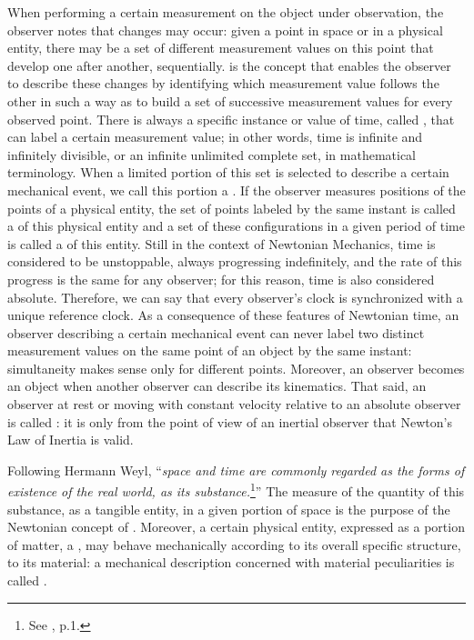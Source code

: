 When performing a certain measurement on the object under observation, the observer notes that changes may occur: given a point in space or in a physical entity, there may be a set of different measurement values on this point that develop one after another, sequentially.  is the concept that enables the observer to describe these changes by identifying which measurement value follows the other in such a way as to build a set of successive measurement values for every observed point. There is always a specific instance or value of time, called , that can label a certain measurement value; in other words, time is infinite and infinitely divisible, or an infinite unlimited complete set, in mathematical terminology. When a limited portion of this set is selected to describe a certain mechanical event, we call this portion a . If the observer measures positions of the points of a physical entity, the set of points labeled by the same instant is called a  of this physical entity and a set of these configurations in a given period of time is called a  of this entity. Still in the context of Newtonian Mechanics, time is considered to be unstoppable, always progressing indefinitely, and the rate of this progress is the same for any observer; for this reason, time is also considered absolute. Therefore, we can say that every observer's clock is synchronized with a unique reference clock. As a consequence of these features of Newtonian time, an observer describing a certain mechanical event can never label two distinct measurement values on the same point of an object by the same instant: simultaneity makes sense only for different points. Moreover, an observer becomes an object when another observer can describe its kinematics. That said, an observer at rest or moving with constant velocity relative to an absolute observer is called : it is only from the point of view of an inertial observer that Newton's Law of Inertia is valid.  


Following Hermann Weyl, ``\emph{space and time are commonly regarded as the forms of existence of the real world,  as its substance.}\footnote{See \cite{weyl_1952_2}, p.1.}'' The measure of the quantity of this substance, as a tangible entity, in a given portion of space is the purpose of the Newtonian concept of . Moreover, a certain physical entity, expressed as a portion of matter, a , may behave mechanically according to its overall specific structure, to its material: a mechanical description concerned with material peculiarities is called .


